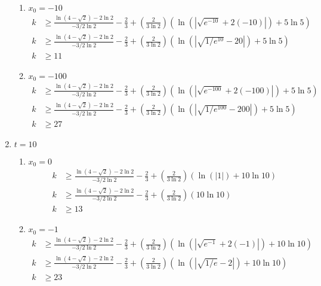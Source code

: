 \documentclass{article}
\begin{document}
\begin{enumerate}
\begin{enumerate}
            \item $x_0 = -10$
            \begin{align*}
                k &\geq \frac{\ln(4 - \sqrt{2}) - 2\ln 2}{-3/2 \ln 2} - \frac{2}{3} +
                \left(\frac{2}{3\ln 2}\right)(\ln(|\sqrt{e^{-10}} + 2(-10)|) + 5 \ln 5)\\
                k &\geq \frac{\ln(4 - \sqrt{2}) - 2\ln 2}{-3/2 \ln 2} - \frac{2}{3} +
                \left(\frac{2}{3\ln 2}\right)(\ln(|\sqrt{1/e^{10}} - 20|) + 5 \ln 5)\\
                k & \geq 11
            \end{align*}
            \item $x_0 = -100$
            \begin{align*}
                k &\geq \frac{\ln(4 - \sqrt{2}) - 2\ln 2}{-3/2 \ln 2} - \frac{2}{3} +
                \left(\frac{2}{3\ln 2}\right)(\ln(|\sqrt{e^{-100}} + 2(-100)|) + 5 \ln 5)\\
                k &\geq \frac{\ln(4 - \sqrt{2}) - 2\ln 2}{-3/2 \ln 2} - \frac{2}{3} +
                \left(\frac{2}{3\ln 2}\right)(\ln(|\sqrt{1/e^{100}} - 200|) + 5 \ln 5)\\
                k & \geq 27
            \end{align*}
        \end{enumerate}
        \item $t = 10$
        \begin{enumerate}
            \item $x_0 = 0$
            \begin{align*}
                k &\geq \frac{\ln(4 - \sqrt{2}) - 2\ln 2}{-3/2 \ln 2} - \frac{2}{3} +
                \left(\frac{2}{3\ln 2}\right)(\ln(|1|) + 10 \ln 10)\\
                k &\geq \frac{\ln(4 - \sqrt{2}) - 2\ln 2}{-3/2 \ln 2} - \frac{2}{3} +
                \left(\frac{2}{3\ln 2}\right)(10 \ln 10)\\
                k & \geq 13
            \end{align*}

            \item $x_0 = -1$
            \begin{align*}
                k &\geq \frac{\ln(4 - \sqrt{2}) - 2\ln 2}{-3/2 \ln 2} - \frac{2}{3} +
                \left(\frac{2}{3\ln 2}\right)(\ln(|\sqrt{e^{-1}} + 2(-1)|) + 10 \ln 10)\\
                k &\geq \frac{\ln(4 - \sqrt{2}) - 2\ln 2}{-3/2 \ln 2} - \frac{2}{3} +
                \left(\frac{2}{3\ln 2}\right)(\ln(|\sqrt{1/e} - 2|) + 10 \ln 10)\\
                k & \geq 23
            \end{align*}


\end{enumerate}
\end{enumerate}
\end{document}
